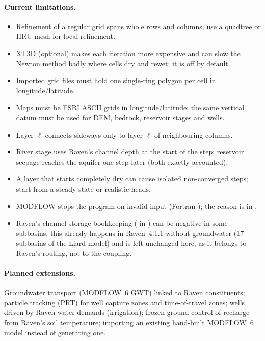 \paragraph{Current limitations.}
\begin{itemize}
\item Refinement of a regular grid spans whole rows and columns; use a quadtree or HRU mesh for local refinement.
\item XT3D (optional) makes each iteration more expensive and can slow the Newton method badly where cells dry and rewet; it is off by default.
\item Imported grid files must hold one single-ring polygon per cell in longitude/latitude.
\item Maps must be ESRI ASCII grids in longitude/latitude; the same vertical datum must be used for DEM, bedrock,
reservoir stages and wells.
\item Layer $\ell$ connects sideways only to layer $\ell$ of neighbouring columns.
\item River stage uses Raven's channel depth at the start of the step; reservoir seepage reaches the aquifer one step
later (both exactly accounted).
\item A layer that starts completely dry can cause isolated non-converged steps; start from a steady state or realistic
heads.
\item MODFLOW stops the program on invalid input (Fortran ); the reason is in .
\item Raven's channel-storage bookkeeping ( in ) can be negative in some subbasins; this
already happens in Raven~4.1.1 without groundwater (17 subbasins of the Liard model) and is left unchanged here, as it belongs
to Raven's routing, not to the coupling.

\end{itemize}
\paragraph{Planned extensions.}
Groundwater transport (MODFLOW~6 GWT) linked to Raven constituents; particle tracking (PRT) for well capture zones and
time-of-travel zones; wells driven by Raven water demands (irrigation); frozen-ground control of recharge from Raven's soil
temperature; importing an existing hand-built MODFLOW~6 model instead of generating one.
